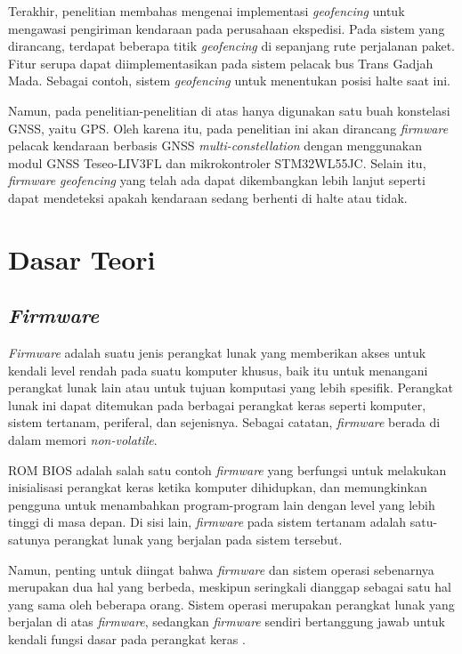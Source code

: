 Terakhir, penelitian \cite{Priono2017} membahas mengenai implementasi \textit{geofencing} untuk mengawasi pengiriman kendaraan pada perusahaan ekspedisi. Pada sistem yang dirancang, terdapat beberapa titik \textit{geofencing} di sepanjang rute perjalanan paket. Fitur serupa dapat diimplementasikan pada sistem pelacak bus Trans Gadjah Mada. Sebagai contoh, sistem \textit{geofencing} untuk menentukan posisi halte saat ini.

Namun, pada penelitian-penelitian di atas hanya digunakan satu buah konstelasi GNSS, yaitu GPS. Oleh karena itu, pada penelitian ini akan dirancang \textit{firmware} pelacak kendaraan berbasis GNSS \textit{multi-constellation} dengan menggunakan modul GNSS Teseo\hyp{}LIV3FL dan mikrokontroler STM32WL55JC. Selain itu, \textit{firmware} \textit{geofencing} yang telah ada dapat dikembangkan lebih lanjut seperti dapat mendeteksi apakah kendaraan sedang berhenti di halte atau tidak.

\section{Dasar Teori}
\subsection{\textit{Firmware}}
\textit{Firmware} adalah suatu jenis perangkat lunak yang memberikan akses untuk kendali level rendah pada suatu komputer khusus, baik itu untuk menangani perangkat lunak lain atau untuk tujuan komputasi yang lebih spesifik. Perangkat lunak ini dapat ditemukan pada berbagai perangkat keras seperti komputer, sistem tertanam, periferal, dan sejenisnya. Sebagai catatan, \textit{firmware} berada di dalam memori \textit{non-volatile}.

ROM BIOS adalah salah satu contoh \textit{firmware} yang berfungsi untuk melakukan inisialisasi perangkat keras ketika komputer dihidupkan, dan memungkinkan pengguna untuk menambahkan program-program lain dengan level yang lebih tinggi di masa depan. Di sisi lain, \textit{firmware} pada sistem tertanam adalah satu-satunya perangkat lunak yang berjalan pada sistem tersebut.

Namun, penting untuk diingat bahwa \textit{firmware} dan sistem operasi sebenarnya merupakan dua hal yang berbeda, meskipun seringkali dianggap sebagai satu hal yang sama oleh beberapa orang. Sistem operasi merupakan perangkat lunak yang berjalan di atas \textit{firmware}, sedangkan \textit{firmware} sendiri bertanggung jawab untuk kendali fungsi dasar pada perangkat keras \cite{Davidson1978}.

